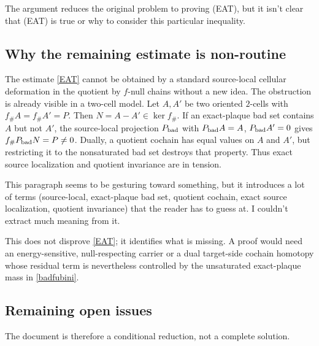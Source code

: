 \documentclass[12pt]{article}
\newcommand{\review}[1]{\begin{reviewbox}#1\end{reviewbox}}
\begin{document}
\review{The argument reduces the original problem to proving (EAT), but it isn't clear that (EAT) is true or why to consider this particular inequality.}

\subsection*{Why the remaining estimate is non-routine}

The estimate \eqref{EAT} cannot be obtained by a standard source-local
cellular deformation in the quotient by \(f\)-null chains without a new idea.
The obstruction is already visible in a two-cell model.  Let \(A,A'\) be two
oriented \(2\)-cells with \(f_\#A=f_\#A'=P\).  Then \(N=A-A'\in\ker f_\#\).
If an exact-plaque bad set contains \(A\) but not \(A'\), the source-local
projection \(P_{\rm bad}\) with \(P_{\rm bad}A=A\), \(P_{\rm bad}A'=0\) gives
\(f_\#P_{\rm bad}N=P\ne0\).  Dually, a quotient cochain has equal values on
\(A\) and \(A'\), but restricting it to the nonsaturated bad set destroys that
property.  Thus exact source localization and quotient invariance are in
tension.

\review{This paragraph seems to be gesturing toward something, but it introduces a lot of terms (source-local, exact-plaque bad set, quotient cochain, exact source localization, quotient invariance) that the reader has to guess at. I couldn't extract much meaning from it.}

This does not disprove \eqref{EAT}; it identifies what is missing.  A proof
would need an energy-sensitive, null-respecting carrier or a dual target-side
cochain homotopy whose residual term is nevertheless controlled by the
unsaturated exact-plaque mass in \eqref{badfubini}.

\subsection*{Remaining open issues}

The document is therefore a conditional reduction, not a complete solution.
\end{document}
